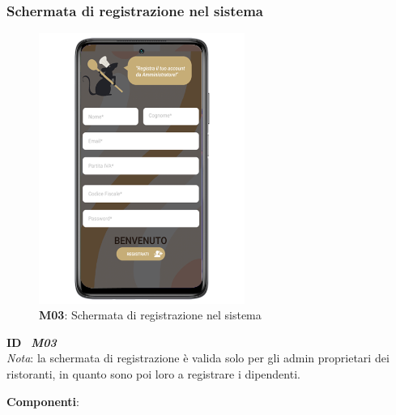         \subsubsection{Schermata di registrazione nel sistema}
        \begin{figure}[H]
            \centering
            \includegraphics[width=0.60\textwidth]{assets/Mockup/Mockup_Registrazione.png}
            \caption{\textbf{M03}: Schermata di registrazione nel sistema}
            \label{fig:Mockup_Register}
        \end{figure}
        \begin{flushleft}
            \textbf{ID} \ \Large{\textit{\textbf{M03}}}\\
            \large{\textit{Nota}: la schermata di registrazione è valida solo per gli admin proprietari dei ristoranti, in quanto sono poi loro a registrare i dipendenti.}\\
        \end{flushleft}
        \textbf{Componenti}:\\
